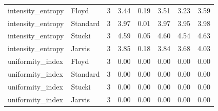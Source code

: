 \begin{tabular}{llrlllll}
intensity_entropy & Floyd & 3 & 3.44 & 0.19 & 3.51 & 3.23 & 3.59 \\
intensity_entropy & Standard & 3 & 3.97 & 0.01 & 3.97 & 3.95 & 3.98 \\
intensity_entropy & Stucki & 3 & 4.59 & 0.05 & 4.60 & 4.54 & 4.63 \\
intensity_entropy & Jarvis & 3 & 3.85 & 0.18 & 3.84 & 3.68 & 4.03 \\
uniformity_index & Floyd & 3 & 0.00 & 0.00 & 0.00 & 0.00 & 0.00 \\
uniformity_index & Standard & 3 & 0.00 & 0.00 & 0.00 & 0.00 & 0.00 \\
uniformity_index & Stucki & 3 & 0.00 & 0.00 & 0.00 & 0.00 & 0.00 \\
uniformity_index & Jarvis & 3 & 0.00 & 0.00 & 0.00 & 0.00 & 0.00 \\
\bottomrule
\end{tabular}
